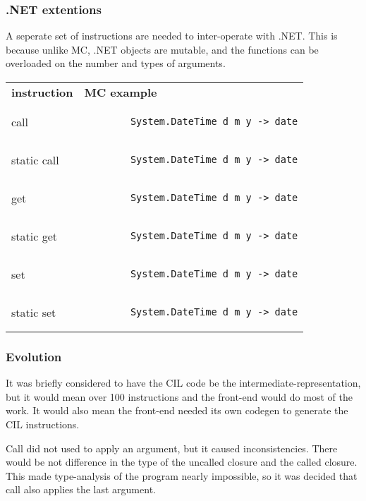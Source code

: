 \subsubsection{.NET extentions}
A seperate set of instructions are needed to inter-operate with .NET.
This is because unlike MC, .NET objects are mutable, and the functions can be overloaded on the number and types of arguments.

\begin{tabular}{ll}
    \textbf{instruction} & \textbf{MC example}\\
    call & \begin{lstlisting}
        System.DateTime d m y -> date
    \end{lstlisting}\\
    static call & \begin{lstlisting}
        System.DateTime d m y -> date
    \end{lstlisting}\\
    get & \begin{lstlisting}
        System.DateTime d m y -> date
    \end{lstlisting}\\
    static get & \begin{lstlisting}
        System.DateTime d m y -> date
    \end{lstlisting}\\
    set & \begin{lstlisting}
        System.DateTime d m y -> date
    \end{lstlisting}\\
    static set & \begin{lstlisting}
        System.DateTime d m y -> date
    \end{lstlisting}\\
\end{tabular}

\subsubsection{Evolution}
It was briefly considered to have the CIL code be the intermediate-representation, but it would mean over 100 instructions and the front-end would do most of the work.
It would also mean the front-end needed its own codegen to generate the CIL instructions.

Call did not used to apply an argument, but it caused inconsistencies.
There would be not difference in the type of the uncalled closure and the called closure.
This made type-analysis of the program nearly impossible, so it was decided that call also applies the last argument.

